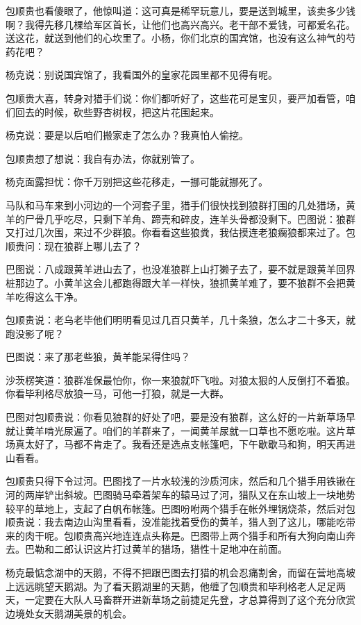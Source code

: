 \par 包顺贵也看傻眼了，他惊叫道：这可真是稀罕玩意儿，要是送到城里，该卖多少钱啊？我得先移几棵给军区首长，让他们也高兴高兴。老干部不爱钱，可都爱名花。送这花，就送到他们的心坎里了。小杨，你们北京的国宾馆，也没有这么神气的芍药花吧？
\par 杨克说：别说国宾馆了，我看国外的皇家花园里都不见得有呢。
\par 包顺贵大喜，转身对猎手们说：你们都听好了，这些花可是宝贝，要严加看管，咱们回去的时候，砍些野杏树杈，把这片花围起来。
\par 杨克说：要是以后咱们搬家走了怎么办？我真怕人偷挖。
\par 包顺贵想了想说：我自有办法，你就别管了。
\par 杨克面露担忧：你千万别把这些花移走，一挪可能就挪死了。
\par 马队和马车来到小河边的一个河套子里，猎手们很快找到狼群打围的几处猎场，黄羊的尸骨几乎吃尽，只剩下羊角、蹄壳和碎皮，连羊头骨都没剩下。巴图说：狼群又打过几次围，来过不少群狼。你看看这些狼粪，我估摸连老狼瘸狼都来过了。包顺贵问：现在狼群上哪儿去了？
\par 巴图说：八成跟黄羊进山去了，也没准狼群上山打獭子去了，要不就是跟黄羊回界桩那边了。小黄羊这会儿都跑得跟大羊一样快，狼抓黄羊难了，要不狼群不会把黄羊吃得这么干净。
\par 包顺贵说：老乌老毕他们明明看见过几百只黄羊，几十条狼，怎么才二十多天，就跑没影了呢？
\par 巴图说：来了那老些狼，黄羊能呆得住吗？
\par 沙茨楞笑道：狼群准保最怕你，你一来狼就吓飞啦。对狼太狠的人反倒打不着狼。你看毕利格尽放狼一马，可他一打狼，就是一大群。
\par 巴图对包顺贵说：你看见狼群的好处了吧，要是没有狼群，这么好的一片新草场早就让黄羊啃光尿遍了。咱们的羊群来了，一闻黄羊尿就一口草也不愿吃啦。这片草场真太好了，马都不肯走了。我看还是选点支帐篷吧，下午歇歇马和狗，明天再进山看看。
\par 包顺贵只得下令过河。巴图找了一片水较浅的沙质河床，然后和几个猎手用铁锹在河的两岸铲出斜坡。巴图骑马牵着架车的辕马过了河，猎队又在东山坡上一块地势较平的草地上，支起了白帆布帐篷。巴图吩咐两个猎手在帐外埋锅烧茶，然后对包顺贵说：我去南边山沟里看看，没准能找着受伤的黄羊，猎人到了这儿，哪能吃带来的肉干呢。包顺贵高兴地连连点头称是。巴图带上两个猎手和所有大狗向南山奔去。巴勒和二郎认识这片打过黄羊的猎场，猎性十足地冲在前面。
\par 杨克最惦念湖中的天鹅，不得不把跟巴图去打猎的机会忍痛割舍，而留在营地高坡上远远眺望天鹅湖。为了看天鹅湖里的天鹅，他缠了包顺贵和毕利格老人足足两天，一定要在大队人马畜群开进新草场之前捷足先登，才总算得到了这个充分欣赏边境处女天鹅湖美景的机会。
